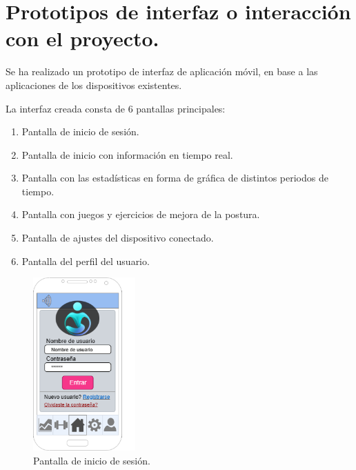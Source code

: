 \clearpage

\section{Prototipos de interfaz o interacción con el proyecto.}

Se ha realizado un prototipo de interfaz de aplicación móvil, en base a las aplicaciones de los dispositivos existentes.

La interfaz creada consta de 6 pantallas principales:
\begin{enumerate}
    \item Pantalla de inicio de sesión.
    \item Pantalla de inicio con información en tiempo real.
    \item Pantalla con las estadísticas en forma de gráfica de distintos periodos de tiempo.
    \item Pantalla con juegos y ejercicios de mejora de la postura.
    \item Pantalla de ajustes del dispositivo conectado.
    \item Pantalla del perfil del usuario.
\end{enumerate}


\begin{figure}[h]
    \centering
    \includegraphics[width=0.35\textwidth]{img/InicioSesion.png}
    \caption{Pantalla de inicio de sesión.}
    \label{fig:inicioSesion} %
\end{figure}

